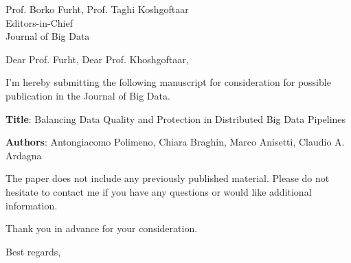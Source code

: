 \documentclass[12pt]{sriletter}
\begin{document}
\signature{\vspace*{-1.4cm}\\
    Claudio Ardagna}

\faxnumber{}

\begin{letter}{%
        Prof. Borko Furht, Prof.  Taghi Koshgoftaar \\
        Editors-in-Chief\\
        Journal of Big Data\\
    }

    \opening{Dear Prof. Furht, Dear Prof. Khoshgoftaar,}

    I'm hereby submitting the following manuscript for consideration for possible publication in the Journal of Big Data.

    \textbf{Title}: Balancing Data Quality and Protection in Distributed Big Data Pipelines

    \textbf{Authors}: Antongiacomo Polimeno, Chiara Braghin, Marco Anisetti, Claudio A. Ardagna

    The paper does not include any previously published material. Please do not hesitate to contact me if you have any questions or would like additional information.

    Thank you in advance for your consideration.

    \closing{Best regards,}

\end{letter}
\end{document}

